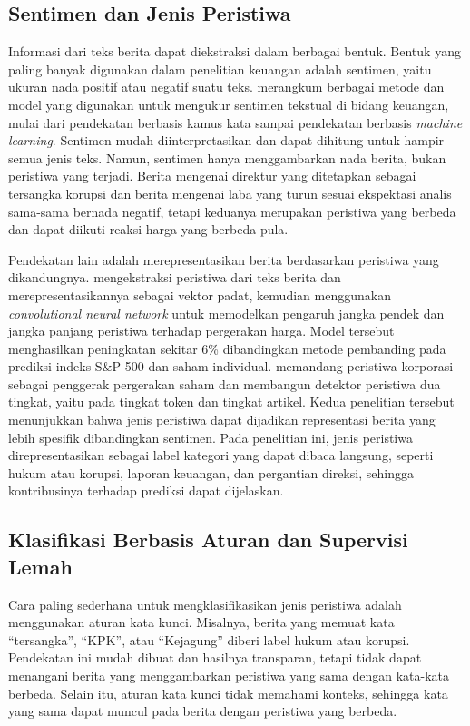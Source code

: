 \subsection{Sentimen dan Jenis Peristiwa}

Informasi dari teks berita dapat diekstraksi dalam berbagai bentuk. Bentuk yang paling banyak digunakan dalam penelitian keuangan adalah sentimen, yaitu ukuran nada positif atau negatif suatu teks. \textcite{kearney2014} merangkum berbagai metode dan model yang digunakan untuk mengukur sentimen tekstual di bidang keuangan, mulai dari pendekatan berbasis kamus kata sampai pendekatan berbasis \emph{machine learning}. Sentimen mudah diinterpretasikan dan dapat dihitung untuk hampir semua jenis teks. Namun, sentimen hanya menggambarkan nada berita, bukan peristiwa yang terjadi. Berita mengenai direktur yang ditetapkan sebagai tersangka korupsi dan berita mengenai laba yang turun sesuai ekspektasi analis sama-sama bernada negatif, tetapi keduanya merupakan peristiwa yang berbeda dan dapat diikuti reaksi harga yang berbeda pula.

Pendekatan lain adalah merepresentasikan berita berdasarkan peristiwa yang dikandungnya. \textcite{ding2015} mengekstraksi peristiwa dari teks berita dan merepresentasikannya sebagai vektor padat, kemudian menggunakan \emph{convolutional neural network} untuk memodelkan pengaruh jangka pendek dan jangka panjang peristiwa terhadap pergerakan harga. Model tersebut menghasilkan peningkatan sekitar 6\% dibandingkan metode pembanding pada prediksi indeks S\&P 500 dan saham individual. \textcite{zhou2021} memandang peristiwa korporasi sebagai penggerak pergerakan saham dan membangun detektor peristiwa dua tingkat, yaitu pada tingkat token dan tingkat artikel. Kedua penelitian tersebut menunjukkan bahwa jenis peristiwa dapat dijadikan representasi berita yang lebih spesifik dibandingkan sentimen. Pada penelitian ini, jenis peristiwa direpresentasikan sebagai label kategori yang dapat dibaca langsung, seperti hukum atau korupsi, laporan keuangan, dan pergantian direksi, sehingga kontribusinya terhadap prediksi dapat dijelaskan.

\subsection{Klasifikasi Berbasis Aturan dan Supervisi Lemah}

Cara paling sederhana untuk mengklasifikasikan jenis peristiwa adalah menggunakan aturan kata kunci. Misalnya, berita yang memuat kata ``tersangka'', ``KPK'', atau ``Kejagung'' diberi label hukum atau korupsi. Pendekatan ini mudah dibuat dan hasilnya transparan, tetapi tidak dapat menangani berita yang menggambarkan peristiwa yang sama dengan kata-kata berbeda. Selain itu, aturan kata kunci tidak memahami konteks, sehingga kata yang sama dapat muncul pada berita dengan peristiwa yang berbeda.

